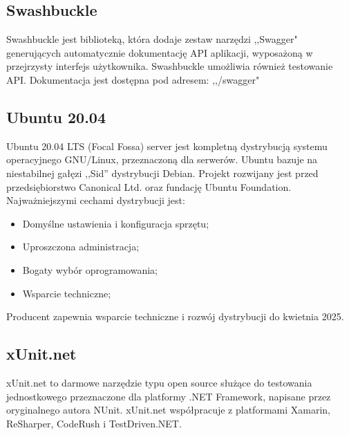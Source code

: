\documentclass[12pt,a4paper]{article}
\begin{document}
		\subsection{Swashbuckle}
			\indent Swashbuckle jest biblioteką, która dodaje zestaw narzędzi ,,Swagger" generujących automatycznie dokumentację API aplikacji,
				wyposażoną w przejrzysty interfejs użytkownika. Swashbuckle umożliwia również testowanie API. Dokumentacja jest dostępna pod adresem: ,,/swagger"

		\subsection{Ubuntu 20.04}		
		\indent Ubuntu 20.04 LTS (Focal Fossa) server jest kompletną dystrybucją systemu operacyjnego GNU/Linux, przeznaczoną dla serwerów. Ubuntu bazuje na niestabilnej gałęzi ,,Sid''
			dystrybucji Debian. Projekt rozwijany jest przed przedsiębiorstwo Canonical Ltd. oraz fundację Ubuntu Foundation. Najważniejszymi cechami dystrybucji jest:
			\begin{itemize}
				\item Domyślne ustawienia i konfiguracja sprzętu;
				\item Uproszczona administracja;
				\item Bogaty wybór oprogramowania;
				\item Wsparcie techniczne;
			\end{itemize}
			Producent zapewnia wsparcie techniczne i rozwój dystrybucji do kwietnia 2025.
			
		\subsection{xUnit.net}
			\indent xUnit.net to darmowe narzędzie typu open source służące do testowania jednostkowego
			przeznaczone dla platformy .NET Framework, napisane przez oryginalnego autora NUnit.
			xUnit.net współpracuje z platformami Xamarin, ReSharper, CodeRush i TestDriven.NET.
		
	\newpage
	
\end{document}

